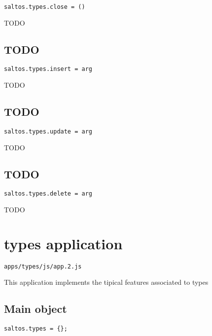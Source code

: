 \documentclass[a4paper]{book}
\begin{document}
\begin{lstlisting}
saltos.types.close = ()
\end{lstlisting}

TODO

\hypertarget{toc116}{}
\subsection{TODO}

\begin{lstlisting}
saltos.types.insert = arg
\end{lstlisting}

TODO

\hypertarget{toc117}{}
\subsection{TODO}

\begin{lstlisting}
saltos.types.update = arg
\end{lstlisting}

TODO

\hypertarget{toc118}{}
\subsection{TODO}

\begin{lstlisting}
saltos.types.delete = arg
\end{lstlisting}

TODO

\hypertarget{toc119}{}
\section{types application}

\begin{lstlisting}
apps/types/js/app.2.js
\end{lstlisting}

This application implements the tipical features associated to types

\hypertarget{toc120}{}
\subsection{Main object}

\begin{lstlisting}
saltos.types = {};
\end{lstlisting}
\end{document}
